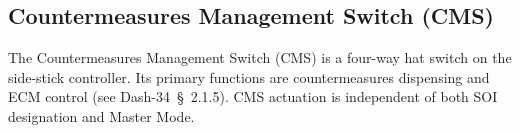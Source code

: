 \documentclass[11pt, a4paper, twoside]{report}
\newcommand{\dashref}[1]{Dash-34~\S~#1}
\begin{document}
\subsection{Countermeasures Management Switch (CMS)}
\label{sec:C2-S3-S3}

The Countermeasures Management Switch (CMS) is a four-way hat switch on the side-stick controller. Its primary functions are countermeasures dispensing and ECM control (see \dashref{2.1.5}). CMS actuation is independent of both SOI designation and Master Mode.

\end{document}
